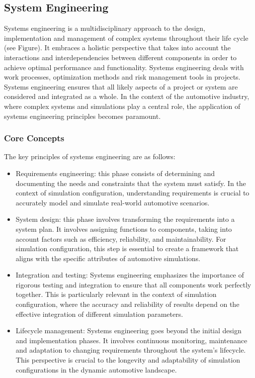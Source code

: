 \subsection{System Engineering \label{sec:sysen}}
Systems engineering is a multidisciplinary approach to the design, implementation and management of complex systems throughout their life cycle (see Figure). It embraces a holistic perspective that takes into account the interactions and interdependencies between different components in order to achieve optimal performance and functionality. Systems engineering deals with work processes, optimization methods and risk management tools in projects. Systems engineering ensures that all likely aspects of a project or system are considered and integrated as a whole. In the context of the automotive industry, where complex systems and simulations play a central role, the application of systems engineering principles becomes paramount.

\subsubsection{Core Concepts}
    The key principles of systems engineering are as follows:
    \begin{itemize}
      \item Requirements engineering: this phase consists of determining and documenting the needs and constraints that the system must satisfy. In the context of simulation configuration, understanding requirements is crucial to accurately model and simulate real-world automotive scenarios.
      
      \item System design: this phase involves transforming the requirements into a system plan. It involves assigning functions to components, taking into account factors such as efficiency, reliability, and maintainability. For simulation configuration, this step is essential to create a framework that aligns with the specific attributes of automotive simulations.
      
      \item Integration and testing: Systems engineering emphasizes the importance of rigorous testing and integration to ensure that all components work perfectly together. This is particularly relevant in the context of simulation configuration, where the accuracy and reliability of results depend on the effective integration of different simulation parameters.
      
      \item Lifecycle management: Systems engineering goes beyond the initial design and implementation phases. It involves continuous monitoring, maintenance and adaptation to changing requirements throughout the system's lifecycle. This perspective is crucial to the longevity and adaptability of simulation configurations in the dynamic automotive landscape.

    \end{itemize}

